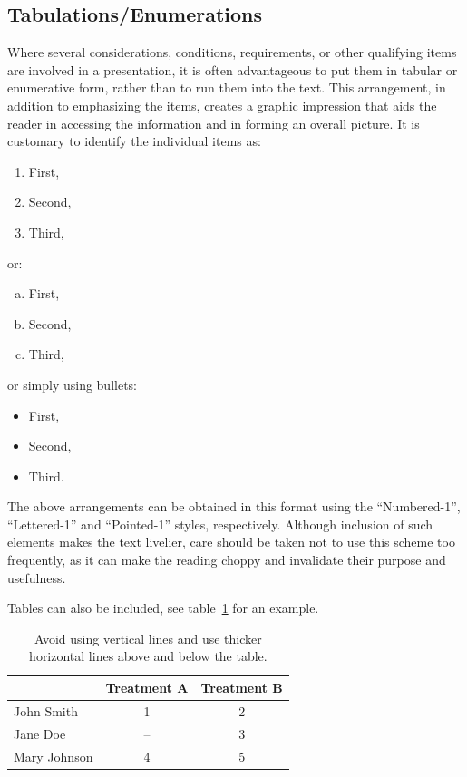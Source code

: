 \documentclass[bibtex,pagenumbers]{stabs2021}
\begin{document}
\subsection{Tabulations/Enumerations}

Where several considerations, conditions, requirements, or other
qualifying items are involved in a presentation, it is often
advantageous to put them in tabular or enumerative form, rather than
to run them into the text. This arrangement, in addition to
emphasizing the items, creates a graphic impression that aids the
reader in accessing the information and in forming an overall picture.
It is customary to identify the individual items as:
\begin{enumerate}[(1)]
  \item First,
  \item Second,
  \item Third,
\end{enumerate}
or:
\begin{enumerate}[(a)]
  \item First,
  \item Second,
  \item Third,
\end{enumerate}
or simply using bullets:
\begin{itemize}
  \item First,
  \item Second,
  \item Third.
\end{itemize}
The above arrangements can be obtained in this format using the
``Numbered-1'', ``Lettered-1'' and ``Pointed-1'' styles, respectively.
Although inclusion of such elements makes the text livelier, care
should be taken not to use this scheme too frequently, as it can make
the reading choppy and invalidate their purpose and usefulness.

Tables can also be included, see table~\ref{tbl:example-table} for an
example.

\begin{table}[ht]
  \centering
  \caption{Avoid using vertical lines and use thicker horizontal lines
    above and below the table.}
  \label{tbl:example-table}
  \begin{tabular}[t]{lcc}
    \toprule
    & Treatment A & Treatment B \\
    \midrule
    John Smith   &  1 & 2 \\
    Jane Doe     & -- & 3 \\
    Mary Johnson &  4 & 5 \\
    \bottomrule
  \end{tabular}
\end{table}
\end{document}

